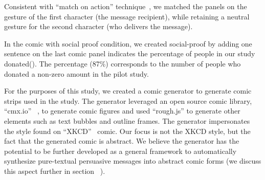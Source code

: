Consistent with ``match on action'' technique~\cite{scott1993understanding}, we matched the panels on the gesture of the first character (the message recipient), while retaining a neutral gesture for the second character (who delivers the message). 



In the comic with social proof condition, we created social-proof by adding one sentence on the last comic panel indicates the percentage of people in our study donated(). The percentage (87\%) corresponds to the number of people who donated a non-zero amount in the pilot study.


For the purposes of this study, we created a comic generator to generate comic strips used in the study. The generator leveraged an open source comic library, ``cmx.io'' ~\cite{cmx.io}, to generate comic figures and used ``rough.js'' \cite{rough.js} to generate other elements such as text bubbles and outline frames. The generator impersonates the style found on ``XKCD''~\cite{munroe2009xkcd} comic. Our focus is not the XKCD style, but the fact that the generated comic is abstract. We believe the generator has the potential to be further developed as a general framework to automatically synthesize pure-textual persuasive messages into abstract comic forms (we discuss this aspect further in section ~).




